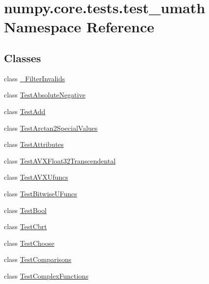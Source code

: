 \hypertarget{namespacenumpy_1_1core_1_1tests_1_1test__umath}{}\section{numpy.\+core.\+tests.\+test\+\_\+umath Namespace Reference}
\label{namespacenumpy_1_1core_1_1tests_1_1test__umath}
\subsection*{Classes}
\begin{DoxyCompactItemize}
\item 
class \hyperlink{classnumpy_1_1core_1_1tests_1_1test__umath_1_1__FilterInvalids}{\+\_\+\+Filter\+Invalids}
\item 
class \hyperlink{classnumpy_1_1core_1_1tests_1_1test__umath_1_1TestAbsoluteNegative}{Test\+Absolute\+Negative}
\item 
class \hyperlink{classnumpy_1_1core_1_1tests_1_1test__umath_1_1TestAdd}{Test\+Add}
\item 
class \hyperlink{classnumpy_1_1core_1_1tests_1_1test__umath_1_1TestArctan2SpecialValues}{Test\+Arctan2\+Special\+Values}
\item 
class \hyperlink{classnumpy_1_1core_1_1tests_1_1test__umath_1_1TestAttributes}{Test\+Attributes}
\item 
class \hyperlink{classnumpy_1_1core_1_1tests_1_1test__umath_1_1TestAVXFloat32Transcendental}{Test\+A\+V\+X\+Float32\+Transcendental}
\item 
class \hyperlink{classnumpy_1_1core_1_1tests_1_1test__umath_1_1TestAVXUfuncs}{Test\+A\+V\+X\+Ufuncs}
\item 
class \hyperlink{classnumpy_1_1core_1_1tests_1_1test__umath_1_1TestBitwiseUFuncs}{Test\+Bitwise\+U\+Funcs}
\item 
class \hyperlink{classnumpy_1_1core_1_1tests_1_1test__umath_1_1TestBool}{Test\+Bool}
\item 
class \hyperlink{classnumpy_1_1core_1_1tests_1_1test__umath_1_1TestCbrt}{Test\+Cbrt}
\item 
class \hyperlink{classnumpy_1_1core_1_1tests_1_1test__umath_1_1TestChoose}{Test\+Choose}
\item 
class \hyperlink{classnumpy_1_1core_1_1tests_1_1test__umath_1_1TestComparisons}{Test\+Comparisons}
\item 
class \hyperlink{classnumpy_1_1core_1_1tests_1_1test__umath_1_1TestComplexFunctions}{Test\+Complex\+Functions}

\end{DoxyCompactItemize}

